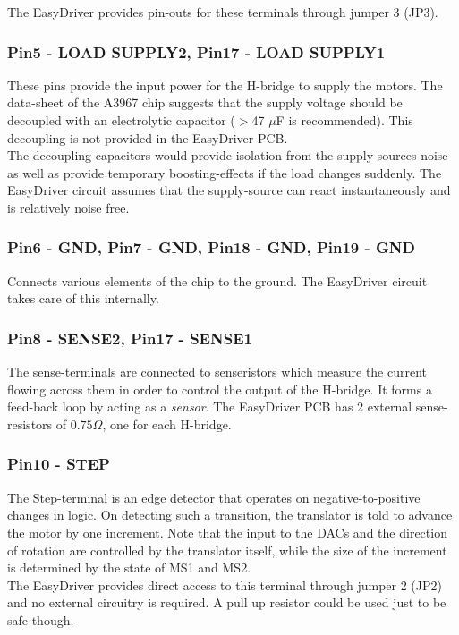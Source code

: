 \documentclass{article}
\theoremstyle{plain}
\theoremstyle{definition}
\theoremstyle{remark}
\begin{document}
The EasyDriver provides pin-outs for these terminals through jumper 3 (JP3).

\subsubsection*{Pin5 - LOAD SUPPLY2, Pin17 - LOAD SUPPLY1}
These pins provide the input power for the H-bridge to supply the motors. The data-sheet of the A3967 chip suggests that the supply voltage should be decoupled with an electrolytic capacitor ($>$47 $\mu$F is recommended). This decoupling is not provided in the EasyDriver PCB.\\


The decoupling capacitors would provide isolation from the supply sources noise as well as provide temporary boosting-effects if the load changes suddenly. The EasyDriver circuit assumes that the supply-source can react instantaneously and is relatively noise free.


\subsubsection*{Pin6 - GND, Pin7 - GND, Pin18 - GND, Pin19 - GND}
Connects various elements of the chip to the ground. The EasyDriver circuit takes care of this internally.

\subsubsection*{Pin8 - SENSE2, Pin17 - SENSE1}
The sense-terminals are connected to senseristors which measure the current flowing across them in order to control the output of the H-bridge. It forms a feed-back loop by acting as a \emph{sensor}. The EasyDriver PCB has 2 external sense-resistors of $0.75\Omega$, one for each H-bridge.

\subsubsection*{Pin10 - STEP}
The Step-terminal is an edge detector that operates on negative-to-positive changes in logic. On detecting such a transition, the  translator is told to advance the motor by one increment. Note that the input to the DACs and the direction of rotation are controlled by the translator itself, while the size of the increment is determined by the state of MS1  and MS2.\\

The EasyDriver provides direct access to this terminal through jumper 2 (JP2) and no external circuitry is required. A pull up resistor could be used just to be safe though.
\end{document}
